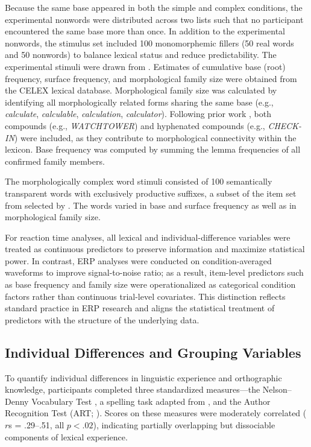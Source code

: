 \documentclass[utf8]{FrontiersinHarvard} %
\begin{document}
	Because the same base appeared in both the simple and complex conditions, the experimental nonwords were distributed across two lists such that no participant encountered the same base more than once. In addition to the experimental nonwords, the stimulus set included 100 monomorphemic fillers (50 real words and 50 nonwords) to balance lexical status and reduce predictability. The experimental stimuli were drawn from \citet{sawiIndividualDifferencesSensitivity2016}.
	Estimates of cumulative base (root) frequency, surface frequency, and morphological family size were obtained from the CELEX lexical database. Morphological family size was calculated by identifying all morphologically related forms sharing the same base (e.g., \textit{calculate}, \textit{calculable}, \textit{calculation}, \textit{calculator}). Following prior work \citep[e.g.,][]{dejongMorphologicalFamilySize2000, dejongProcessingRepresentationDutch2002}, both compounds (e.g., \textit{WATCHTOWER}) and hyphenated compounds (e.g., \textit{CHECK-IN}) were included, as they contribute to morphological connectivity within the lexicon. Base frequency was computed by summing the lemma frequencies of all confirmed family members.
	
	The morphologically complex word stimuli consisted of 100 semantically transparent words with exclusively productive suffixes, a subset of the item set from \citet{fordDerivationalMorphologyBase2010} selected by \citet{sawiIndividualDifferencesSensitivity2016}. The words varied in base and surface frequency as well as in morphological family size.
	
	For reaction time analyses, all lexical and individual-difference variables were treated as continuous predictors to preserve information and maximize statistical power. In contrast, ERP analyses were conducted on condition-averaged waveforms to improve signal-to-noise ratio; as a result, item-level predictors such as base frequency and family size were operationalized as categorical condition factors rather than continuous trial-level covariates. This distinction reflects standard practice in ERP research and aligns the statistical treatment of predictors with the structure of the underlying data.
	
	\subsection{Individual Differences and Grouping Variables}
	
	To quantify individual differences in linguistic experience and orthographic knowledge, participants completed three standardized measures---the Nelson–Denny Vocabulary Test \citep{brownNelsonDennyReadingTest1993}, a spelling task adapted from \citet{sawiIndividualDifferencesSensitivity2016}, and the Author Recognition Test (ART; \citealt{stanovichExposurePrintOrthographic1989}). Scores on these measures were moderately correlated ($r$s = .29–.51, all $p < .02$), indicating partially overlapping but dissociable components of lexical experience.
	
\end{document}

